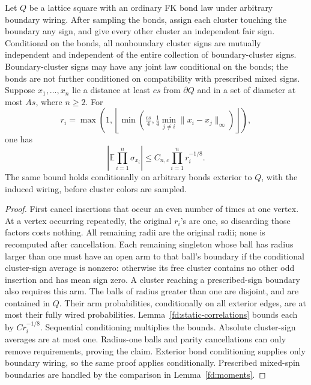 \begin{lemma}\label{fd:fk-product}
Let \(Q\) be a lattice square with an ordinary FK bond law under
arbitrary boundary wiring.  After sampling the bonds, assign each
cluster touching the boundary any sign, and give every other cluster
an independent fair sign.  Conditional on the bonds, all nonboundary
cluster signs are mutually independent and independent of the entire
collection of boundary-cluster signs.  Boundary-cluster signs may have
any joint law conditional on the bonds; the bonds are not further conditioned on compatibility
with prescribed mixed signs.  Suppose
\(x_1,\ldots,x_n\) lie a distance at least \(cs\) from \(\partial Q\)
and in a set of diameter at most \(As\), where \(n\ge2\).
For
\[
 r_i=\max\left(1,\left\lfloor
       \min\left(\tfrac{cs}{4},
             \tfrac14\min_{j\ne i}\|x_i-x_j\|_\infty\right)
                         \right\rfloor\right),
\]
one has
\[
 \left|\mathbb E\prod_{i=1}^n\sigma_{x_i}\right|
 \le C_{n,c}\prod_{i=1}^n r_i^{-1/8}.
\]
The same bound holds conditionally on arbitrary bonds exterior to \(Q\),
with the induced wiring, before cluster colors are sampled.
\end{lemma}

\begin{proof}
First cancel insertions that occur an even number of times at one vertex.
At a vertex occurring repeatedly, the original \(r_i\)'s are one, so
discarding those factors costs nothing.  All remaining radii are the
original radii; none is recomputed after cancellation.  Each remaining singleton whose
ball has radius larger than one must have an open arm to that ball's
boundary if the conditional cluster-sign average is nonzero: otherwise
its free cluster contains no other odd insertion and has mean sign zero.
A cluster reaching a prescribed-sign boundary also requires this arm.
The balls of radius greater than one are disjoint, and are contained in
\(Q\).  Their arm probabilities, conditionally on all exterior edges,
are at most their fully wired probabilities.  Lemma~\ref{fd:static-correlations}
bounds each by \(Cr_i^{-1/8}\).  Sequential conditioning multiplies
the bounds.  Absolute cluster-sign averages are at most one.  Radius-one
balls and parity cancellations can only remove requirements, proving the
claim.  Exterior bond conditioning supplies only boundary wiring,
so the same proof applies conditionally.  Prescribed mixed-spin
boundaries are handled by the comparison in Lemma~\ref{fd:moments}.
\end{proof}

